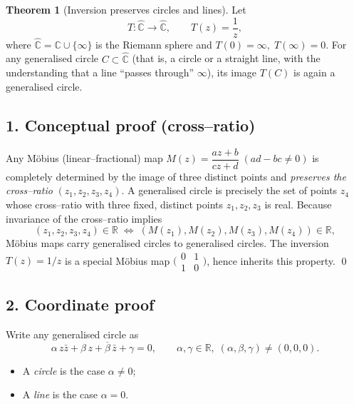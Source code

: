 \documentclass[12pt]{article}
\title{}
\author{Jerich Lee}
\date{\today}
\theoremstyle{definition} %
\newtheorem{theorem}{Theorem}
\theoremstyle{plain} %
\begin{document}
\maketitle


\begin{theorem}[Inversion preserves circles and lines]
  Let
  \[
     T : \widehat{\mathbb C}\longrightarrow\widehat{\mathbb C},
     \qquad T(z)=\frac{1}{z},
  \]
  where \(\widehat{\mathbb C}=\mathbb C\cup\{\infty\}\) is the Riemann
  sphere and \(T(0)=\infty,\; T(\infty)=0\).
  For any generalised circle  
  \(C\subset\widehat{\mathbb C}\) (that is, a circle or a straight line,
  with the understanding that a line “passes through” \(\infty\)),
  its image \(T(C)\) is again a generalised circle.
  \end{theorem}
  
  \subsection*{1. Conceptual proof (cross–ratio)}
  Any Möbius (linear–fractional) map
  \(M(z)=\dfrac{az+b}{cz+d}\;(ad-bc\neq0)\) is completely determined by
  the image of three distinct points and \emph{preserves the cross–ratio}
  \((z_1,z_2,z_3,z_4)\).  A generalised circle is precisely the set of
  points \(z_4\) whose cross–ratio with three fixed, distinct
  points \(z_1,z_2,z_3\) is real.  
  Because invariance of the cross–ratio implies
  \[
     (z_1,z_2,z_3,z_4)\in\mathbb R 
     \;\Longleftrightarrow\;
     (M(z_1),M(z_2),M(z_3),M(z_4))\in\mathbb R,
  \]
  Möbius maps carry generalised circles to generalised circles.
  The inversion \(T(z)=1/z\) is a special Möbius map
  \(\bigl(\begin{smallmatrix}0&1\\ 1&0\end{smallmatrix}\bigr)\), hence
  inherits this property.
  \qed
  
  \subsection*{2. Coordinate proof}
  Write any generalised circle as
  \[
     \alpha\,z\bar z+\beta\,z+\overline{\beta}\,\bar z+\gamma=0,
     \qquad \alpha,\gamma\in\mathbb R,\;
     (\alpha,\beta,\gamma)\neq(0,0,0).
     \tag{$\star$}
  \]
  \begin{itemize}
  \item A \emph{circle} is the case \(\alpha\neq0\);
  \item A \emph{line} is the case \(\alpha=0\).
  \end{itemize}
  
\end{document}
